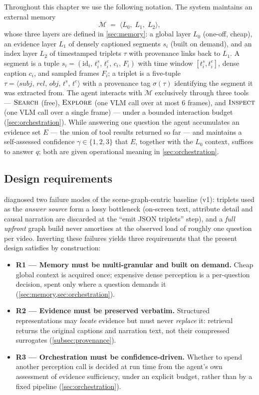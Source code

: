 Throughout this chapter we use the following notation. The system maintains an external memory
%
\begin{equation}
\label{eq:mem}
\mathcal{M} \;=\; \langle L_0,\; L_1,\; L_2 \rangle,
\end{equation}
%
whose three layers are defined in \cref{sec:memory}: a global layer $L_0$ (one-off, cheap), an evidence layer
$L_1$ of densely captioned segments $s_i$ (built on demand), and an index layer $L_2$ of
timestamped triplets $\tau$ with provenance links back to $L_1$. A segment is a tuple
$s_i = (\mathrm{id}_i,\, t_i^{s},\, t_i^{e},\, c_i,\, F_i)$ with time window $[t_i^s, t_i^e]$,
dense caption $c_i$, and sampled frames $F_i$; a triplet is a five-tuple
$\tau = \langle \mathit{subj},\, \mathit{rel},\, \mathit{obj},\, t^{s},\, t^{e} \rangle$ with a
provenance tag $\sigma(\tau)$ identifying the segment it was extracted from. The agent interacts
with $\mathcal{M}$ exclusively through three tools --- $\textsc{Search}$ (free), $\textsc{Explore}$
(one VLM call over at most 6 frames), and $\textsc{Inspect}$ (one VLM call over a single frame) ---
under a bounded interaction budget (\cref{sec:orchestration}). While answering one question the agent accumulates an
evidence set $E$ --- the union of tool results returned so far --- and maintains a self-assessed
confidence $\gamma \in \{1, 2, 3\}$ that $E$, together with the $L_0$ context, suffices to answer
$q$; both are given operational meaning in \cref{sec:orchestration}.

\subsection{Design requirements}
\label{subsec:requirements}

 diagnosed two failure modes of the scene-graph-centric baseline (v1): triplets used as
the \emph{answer source} form a lossy bottleneck (on-screen text, attribute detail and causal narration
are discarded at the ``emit JSON triplets'' step), and a \emph{full upfront} graph build never amortises
at the observed load of roughly one question per video. Inverting these failures yields three
requirements that the present design satisfies by construction:

\begin{itemize}
  \item \textbf{R1 --- Memory must be multi-granular and built on demand.} Cheap global context is acquired
  once; expensive dense perception is a per-question decision, spent only where a question demands
  it (\cref{sec:memory,sec:orchestration}).
  \item \textbf{R2 --- Evidence must be preserved verbatim.} Structured representations may \emph{locate} evidence
  but must never \emph{replace} it: retrieval returns the original captions and narration text, not
  their compressed surrogates (\cref{subsec:provenance}).
  \item \textbf{R3 --- Orchestration must be confidence-driven.} Whether to spend another perception call is
  decided at run time from the agent's own assessment of evidence sufficiency, under an explicit
  budget, rather than by a fixed pipeline (\cref{sec:orchestration}).
\end{itemize}

